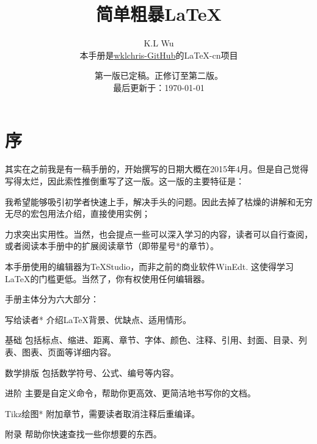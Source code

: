 

\title{简单粗暴\LaTeX }
\author{K.L Wu\\
  {\kaishu 本手册是\href{https://github.com/wklchris/Note-by-LaTeX}{wklchris-GitHub}的\LaTeX{}-cn项目}
}
\date{第一版已定稿。正修订至第二版。\\
  最后更新于：\today}



\maketitle

\setlength{\lineskiplimit}{0pt}
\tableofcontents
\setlength{\lineskiplimit}{3pt}

\chapter{序}

\dpar\dpar

其实在之前我是有一稿手册的，开始撰写的日期大概在2015年4月。但是自己觉得写得太烂，因此索性推倒重写了这一版。这一版的主要特征是：
\begin{feae}
  \item 我希望能够吸引初学者快速上手，解决手头的问题。因此去掉了枯燥的讲解和无穷无尽的宏包用法介绍，直接使用实例；
  \item 力求突出实用性。当然，也会提点一些可以深入学习的内容，读者可以自行查阅，或者阅读本手册中的扩展阅读章节（即带星号*的章节）。
  \item 本手册使用的编辑器为\TeX Studio，而非之前的商业软件WinEdt. 这使得学习\LaTeX 的门槛更低。当然了，你有权使用任何编辑器。
\end{feae}

手册主体分为六大部分\cite{LHY2013latex,lamport1986document,mittelbach2004latex,partl2016}：
\begin{fead}
\item[写给读者*] 介绍\LaTeX 背景、优缺点、适用情形。
\item[基础] 包括标点、缩进、距离、章节、字体、颜色、注释、引用、封面、目录、列表、图表、页面等详细内容。
\item[数学排版] 包括数学符号、公式、编号等内容。
\item[进阶] 主要是自定义命令，帮助你更高效、更简洁地书写你的文档。
\item[Tikz绘图*] 附加章节，需要读者取消注释后重编译。
\item[附录] 帮助你快速查找一些你想要的东西。
\end{fead}

